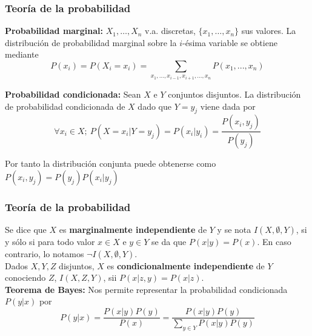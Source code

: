 \documentclass[leqno]{beamer}
\begin{document}

\begin{frame}
\frametitle{Teoría de la probabilidad}

\textbf{Probabilidad marginal:} $X_1, \dots, X_n$ v.a. discretas, $\{x_1,\dots,x_n\}$ sus valores. La distribución de probabilidad marginal sobre la $i$-ésima variable se obtiene mediante
	\[	P(x_i) = P(X_i=x_i) = 
	\sum_{x_1,...,x_{i-1},x_{i+1},...,x_n}P(x_1,...,x_n)	\]
	
\textbf{Probabilidad condicionada:}  Sean $X$ e $Y$ conjuntos disjuntos. La distribución de probabilidad condicionada de $X$ dado que $Y=y_j$ viene dada por
	\[ \forall x_i \in X;\ P(X=x_i | Y = y_j) = P(x_i|y_i) = 
	\frac{P(x_i,y_j)}{P(y_j)}\]

Por tanto la distribución conjunta puede obtenerse como $P(x_i,y_j) = P(y_j)P(x_i|y_j)$

\end{frame}

\begin{frame}
\frametitle{Teoría de la probabilidad}

Se dice que $X$ es \textbf{marginalmente independiente} de $Y$ y se nota $I(X,\emptyset,Y)$, si y sólo si para todo valor $x \in X$ e $y \in Y$ se da que $P(x|y)=P(x)$. En caso contrario, lo notamos $\neg I(X,\emptyset,Y)$.\\

Dados $X,Y,Z$ disjuntos, $X$ es \textbf{condicionalmente independiente} de $Y$ conociendo $Z$, $I(X,Z,Y)$, sii $P(x|z,y)= P(x|z)$.\\

\textbf{Teorema de Bayes:} Nos permite representar la probabilidad condicionada $P(y|x)$ por 
\[P(y|x) = \frac{P(x|y)P(y)}{P(x)} = \frac{P(x|y)P(y)}{\sum\limits_{y\in Y} P(x|y)P(y)}\]
\end{frame}
\end{document}
